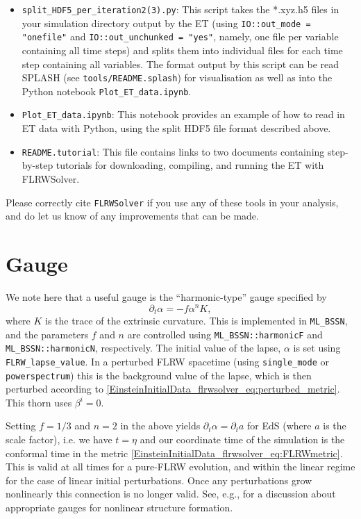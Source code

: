 \begin{itemize}
\item \texttt{split\_HDF5\_per\_iteration2(3).py}: This script takes the *.xyz.h5 files in your simulation directory output by the ET (using \texttt{IO::out\_mode = "onefile"} and \texttt{IO::out\_unchunked = "yes"}, namely, one file per variable containing all time steps) and splits them into individual files for each time step containing all variables. The format output by this script can be read SPLASH (see \texttt{tools/README.splash}) for visualisation as well as into the Python notebook \texttt{Plot\_ET\_data.ipynb}.

\item \texttt{Plot\_ET\_data.ipynb}: This notebook provides an example of how to read in ET data with Python, using the split HDF5 file format described above.

\item \texttt{README.tutorial}: This file contains links to two documents containing step-by-step tutorials for downloading, compiling, and running the ET with FLRWSolver. 

\end{itemize}
Please correctly cite \texttt{FLRWSolver} if you use any of these tools in your analysis, and do let us know of any improvements that can be made. 


\section{Gauge}
\label{EinsteinInitialData_flrwsolver_sec:gauge}

We note here that a useful gauge is the ``harmonic-type'' gauge specified by
\begin{equation}
	\partial_t \alpha = - f \alpha^n K,
\end{equation}
where $K$ is the trace of the extrinsic curvature. This is implemented in \texttt{ML\_BSSN}, and the parameters $f$ and $n$ are controlled using \texttt{ML\_BSSN::harmonicF} and \texttt{ML\_BSSN::harmonicN}, respectively. The initial value of the lapse, $\alpha$ is set using \texttt{FLRW\_lapse\_value}. In a perturbed FLRW spacetime (using {\tt single\_mode} or {\tt powerspectrum}) this is the background value of the lapse, which is then perturbed according to \eqref{EinsteinInitialData_flrwsolver_eq:perturbed_metric}. This thorn uses $\beta^i=0$.

Setting $f=1/3$ and $n=2$ in the above yields $\partial_t \alpha = \partial_t a$ for EdS (where $a$ is the scale factor), i.e. we have $t=\eta$ and our coordinate time of the simulation is the conformal time in the metric \eqref{EinsteinInitialData_flrwsolver_eq:FLRWmetric}. This is valid at all times for a pure-FLRW evolution, and within the linear regime for the case of linear initial perturbations. Once any perturbations grow nonlinearly this connection is no longer valid. See, e.g., \cite{EinsteinInitialData_flrwsolver_macpherson2019} for a discussion about appropriate gauges for nonlinear structure formation. 



